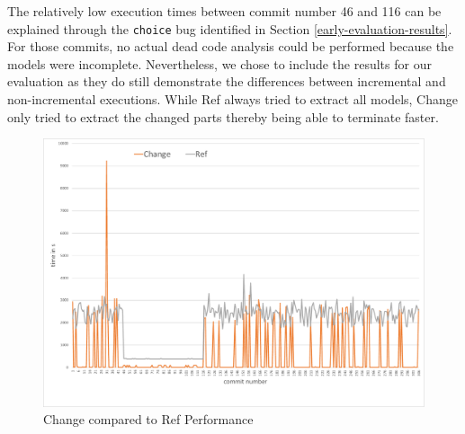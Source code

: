 \documentclass[a4paper]{article}
\begin{document}
The relatively low execution times between commit number 46 and 116 can be explained through the \texttt{choice} bug identified in Section \ref{early-evaluation-results}. For those commits, no actual dead code analysis could be performed because the models were incomplete. Nevertheless, we chose to include the results for our evaluation as they do still demonstrate the differences between incremental and non-incremental executions. While Ref always tried to extract all models, Change only tried to extract the changed parts thereby being able to terminate faster. 


\begin{figure}[h] 
  \centering
  \begin{minipage}[b]{1\textwidth} 
    \caption[Change Performance]{Change compared to Ref Performance}\label{fig:change}
    \centering
    \includegraphics[height=1\textwidth, angle=90]{img/change-vs-ref.pdf}
  \end{minipage}
\end{figure}
\end{document}
